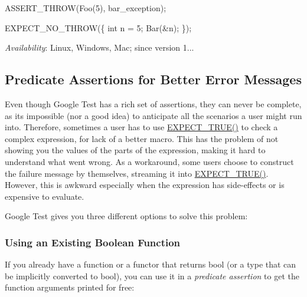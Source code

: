 \begin{DoxyCode}
ASSERT\_THROW(Foo(5), bar\_exception);

EXPECT\_NO\_THROW(\{
  int n = 5;
  Bar(&n);
\});
\end{DoxyCode}


{\itshape Availability}\+: Linux, Windows, Mac; since version 1...

\subsection*{Predicate Assertions for Better Error Messages}

Even though Google Test has a rich set of assertions, they can never be complete, as it\textquotesingle{}s impossible (nor a good idea) to anticipate all the scenarios a user might run into. Therefore, sometimes a user has to use {\ttfamily \hyperlink{gtest_8h_ac33e7cdfb5d44a7a0f0ab552eb5c3c6a}{E\+X\+P\+E\+C\+T\+\_\+\+T\+R\+U\+E()}} to check a complex expression, for lack of a better macro. This has the problem of not showing you the values of the parts of the expression, making it hard to understand what went wrong. As a workaround, some users choose to construct the failure message by themselves, streaming it into {\ttfamily \hyperlink{gtest_8h_ac33e7cdfb5d44a7a0f0ab552eb5c3c6a}{E\+X\+P\+E\+C\+T\+\_\+\+T\+R\+U\+E()}}. However, this is awkward especially when the expression has side-\/effects or is expensive to evaluate.

Google Test gives you three different options to solve this problem\+:

\subsubsection*{Using an Existing Boolean Function}

If you already have a function or a functor that returns {\ttfamily bool} (or a type that can be implicitly converted to {\ttfamily bool}), you can use it in a {\itshape predicate assertion} to get the function arguments printed for free\+:

